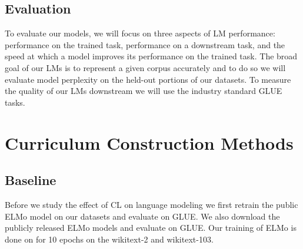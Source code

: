 \subsection{Evaluation}
To evaluate our models, we will focus on three aspects of LM performance: performance on the trained task, performance on a downstream task, and the speed at which a model improves its performance on the trained task. The broad goal of our LMs is to represent a given corpus accurately and to do so we will evaluate model perplexity on the held-out portions of our datasets.
To measure the quality of our LMs downstream we will use the industry standard GLUE tasks.
\section{Curriculum Construction Methods}
\label{chap:method:sec:cldevelopment}
\subsection{Baseline}
Before we study the effect of CL on language modeling we first retrain the public ELMo model on our datasets and evaluate on GLUE. We also download the publicly released ELMo models and evaluate on GLUE. Our training of ELMo is done on for 10 epochs on the wikitext-2 and wikitext-103.
